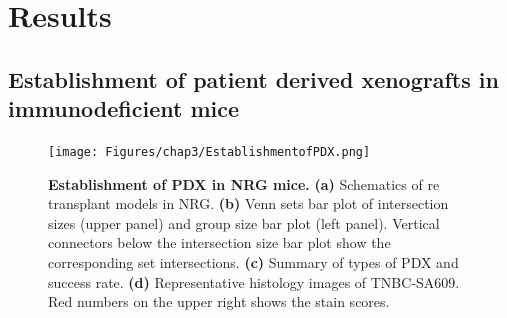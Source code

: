  


\newpage 
\section{Results}

\subsection{Establishment of patient derived xenografts in immunodeficient mice}


\begin{figure}
	\centering
	\texttt{[image: Figures/chap3/EstablishmentofPDX.png]}
	\caption[Establishment of PDX in NRG mice]
	{\small
	    \textbf{Establishment of PDX in NRG mice.}
	    \textbf{(a)} Schematics of re transplant models in NRG.
	    \textbf{(b)} Venn sets bar plot of intersection sizes (upper panel) and group size bar plot (left panel). Vertical connectors below the intersection size bar plot show the corresponding set intersections.
	    \textbf{(c)} Summary of types of PDX and success rate.
	     \textbf{(d)} Representative histology images of TNBC-SA609. Red numbers on the upper right shows the stain scores.
	}

	\label{fig:EstablishmentofPDX}
\end{figure}

